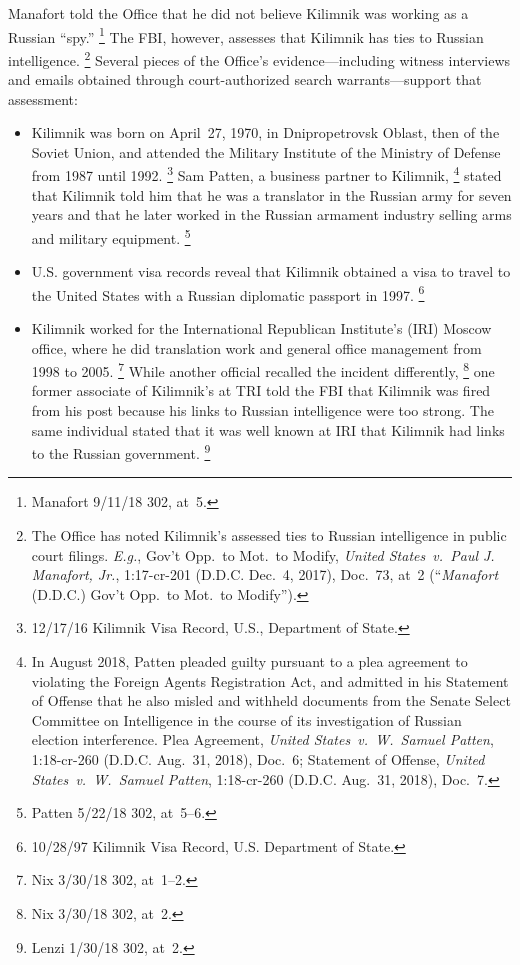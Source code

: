 Manafort told the Office that he did not believe Kilimnik was working as a Russian ``spy.''%
\footnote{Manafort 9/11/18 302, at~5.}
The FBI, however, assesses that Kilimnik has ties to Russian intelligence.%
\footnote{The Office has noted Kilimnik's assessed ties to Russian intelligence in public court filings.
\textit{E.g.}, Gov't Opp.\ to Mot.\ to Modify, \textit{United States~v.\ Paul J. Manafort, Jr.}, 1:17-cr-201 (D.D.C. Dec.~4, 2017), Doc.~73, at~2 (``\textit{Manafort} (D.D.C.) Gov't Opp.\ to Mot.\ to Modify'').}
Several pieces of the Office's evidence---including witness interviews and emails obtained through court-authorized search warrants---support that assessment:

\begin{itemize}

    \item Kilimnik was born on April~27, 1970, in Dnipropetrovsk Oblast, then of the Soviet Union, and attended the Military Institute of the Ministry of Defense from 1987 until 1992.%
\footnote{12/17/16 Kilimnik Visa Record, U.S., Department of State.}
    Sam Patten, a business partner to Kilimnik,%
\footnote{In August 2018, Patten pleaded guilty pursuant to a plea agreement to violating the Foreign Agents Registration Act, and admitted in his Statement of Offense that he also misled and withheld documents from the Senate Select Committee on Intelligence in the course of its investigation of Russian election interference.
Plea Agreement, \textit{United States~v.\ W.~Samuel Patten}, 1:18-cr-260 (D.D.C. Aug.~31, 2018), Doc.~6;
Statement of Offense, \textit{United States~v.\ W.~Samuel Patten}, 1:18-cr-260 (D.D.C. Aug.~31, 2018), Doc.~7.}
    stated that Kilimnik told him that he was a translator in the Russian army for seven years and that he later worked in the Russian armament industry selling arms and military equipment.%
\footnote{Patten 5/22/18 302, at~5--6.}

    \item U.S. government visa records reveal that Kilimnik obtained a visa to travel to the United States with a Russian diplomatic passport in 1997.%
\footnote{10/28/97 Kilimnik Visa Record, U.S. Department of State.}

    \item Kilimnik worked for the International Republican Institute's (IRI) Moscow office, where he did translation work and general office management from 1998 to 2005.%
\footnote{Nix 3/30/18 302, at~1--2.}
    While another official recalled the incident differently,%
\footnote{Nix 3/30/18 302, at~2.}
    one former associate of Kilimnik's at TRI told the FBI that Kilimnik was fired from his post because his links to Russian intelligence were too strong.
    The same individual stated that it was well known at IRI that Kilimnik had links to the Russian government.%
\footnote{Lenzi 1/30/18 302, at~2.}


\end{itemize}
